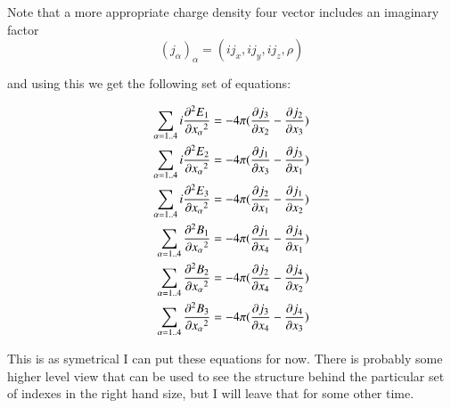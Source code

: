 \documentclass{article}      %
\newcommand{\dds}[2]{ {{\partial^2{#1}} \over {\partial{#2}^2}}}
\newcommand{\D}[2] {{{\partial #2} \over {\partial #1}}}
\begin{document}
Note that a more appropriate charge density four vector includes an imaginary factor
\begin{equation*}
(j_\alpha)_\alpha = (i j_x, i j_y, i j_z, \rho)
\end{equation*}

and using this we get the following set of equations:

\begin{align*}
\sum_{\alpha = 1 .. 4}{i \dds{E_1} {x_\alpha}} &= - 4\pi (\D {x_2}{j_3} - \D {x_3}{j_2}) \\
\sum_{\alpha = 1 .. 4}{i \dds{E_2} {x_\alpha}} &= - 4\pi (\D {x_3}{j_1} - \D {x_1}{j_3}) \\
\sum_{\alpha = 1 .. 4}{i \dds{E_3} {x_\alpha}} &= - 4\pi (\D {x_1}{j_2} - \D {x_2}{j_1}) \\
\sum_{\alpha = 1 .. 4}{\dds{B_1} {x_\alpha}} &= - 4\pi (\D {x_4}{j_1} - \D{x_1}{j_4})\\
\sum_{\alpha = 1 .. 4}{\dds{B_2} {x_\alpha}} &= - 4\pi (\D {x_4}{j_2} - \D{x_2}{j_4})\\
\sum_{\alpha = 1 .. 4}{\dds{B_3} {x_\alpha}} &= - 4\pi (\D {x_4}{j_3} - \D{x_3}{j_4})
\end{align*}

This is as symetrical I can put these equations for now.  There is probably some higher level 
view that can be used to see the structure behind the particular set of indexes in the right 
hand size, but I will leave that for some other time.
\end{document}
